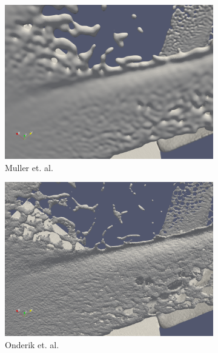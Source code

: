 \begin{figure}
	\begin{center}
		\begin{subfigure}[b]{0.48\textwidth}
			\includegraphics[width=\textwidth]{figures/MullerEtAlForRelWorkDoubleDamBreak.png}
			\caption{Muller et. al.}
		\end{subfigure}
		\begin{subfigure}[b]{0.48\textwidth}
			\includegraphics[width=\textwidth]{figures/OnderikEtAlForRelWorkDoubleDamBreak.png}
			\caption{Onderik et. al.}
		\end{subfigure}
		\begin{subfigure}[b]{0.48\textwidth}

\end{subfigure}
\end{center}
\end{figure}
